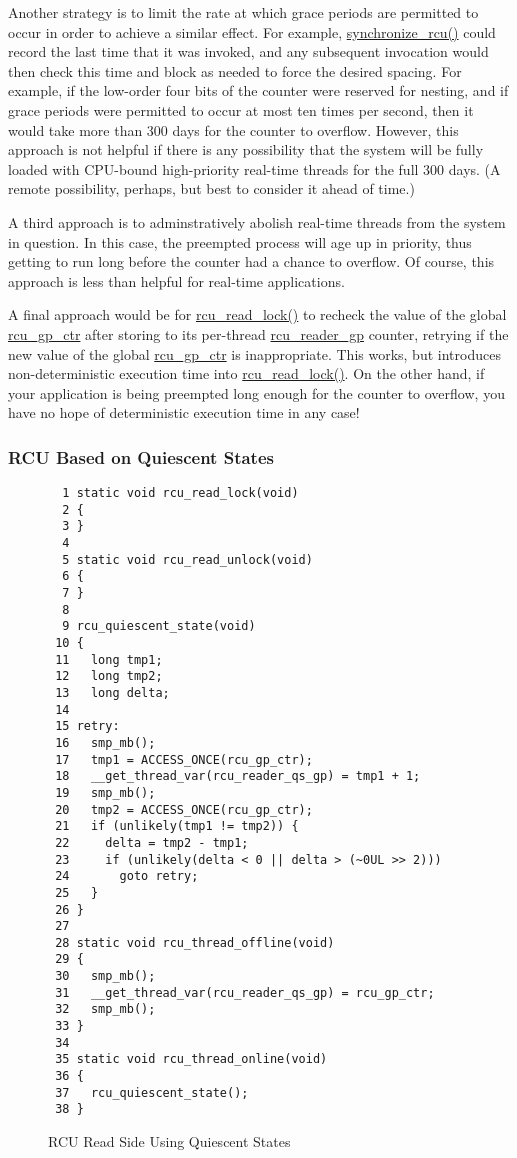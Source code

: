 {	Another strategy is to limit the rate at which grace periods are
	permitted to occur in order to achieve a similar effect.
	For example, \url{synchronize_rcu()} could record the last time
	that it was invoked, and any subsequent invocation would then
	check this time and block as needed to force the desired
	spacing.
	For example, if the low-order four bits of the counter were
	reserved for nesting, and if grace periods were permitted to
	occur at most ten times per second, then it would take more
	than 300 days for the counter to overflow.
	However, this approach is not helpful if there is any possibility
	that the system will be fully loaded with CPU-bound high-priority
	real-time threads for the full 300 days.
	(A remote possibility, perhaps, but best to consider it ahead
	of time.)

	A third approach is to adminstratively abolish real-time threads
	from the system in question.
	In this case, the preempted process will age up in priority,
	thus getting to run long before the counter had a chance to
	overflow.
	Of course, this approach is less than helpful for real-time
	applications.

	A final approach would be for \url{rcu_read_lock()} to recheck
	the value of the global \url{rcu_gp_ctr} after storing to its
	per-thread \url{rcu_reader_gp} counter, retrying if the new
	value of the global \url{rcu_gp_ctr} is inappropriate.
	This works, but introduces non-deterministic execution time
	into \url{rcu_read_lock()}.
	On the other hand, if your application is being preempted long
	enough for the counter to overflow, you have no hope of
	deterministic execution time in any case!
} \QuickQuizEnd

\subsubsection{RCU Based on Quiescent States}
\label{defer:RCU Based on Quiescent States}

\begin{figure}[tbp]
{ \scriptsize
\begin{verbatim}
  1 static void rcu_read_lock(void)
  2 {
  3 }
  4 
  5 static void rcu_read_unlock(void)
  6 {
  7 }
  8 
  9 rcu_quiescent_state(void)
 10 {
 11   long tmp1;
 12   long tmp2;
 13   long delta;
 14 
 15 retry:
 16   smp_mb();
 17   tmp1 = ACCESS_ONCE(rcu_gp_ctr);
 18   __get_thread_var(rcu_reader_qs_gp) = tmp1 + 1;
 19   smp_mb();
 20   tmp2 = ACCESS_ONCE(rcu_gp_ctr);
 21   if (unlikely(tmp1 != tmp2)) {
 22     delta = tmp2 - tmp1;
 23     if (unlikely(delta < 0 || delta > (~0UL >> 2)))
 24       goto retry;
 25   }
 26 }
 27 
 28 static void rcu_thread_offline(void)
 29 {
 30   smp_mb();
 31   __get_thread_var(rcu_reader_qs_gp) = rcu_gp_ctr;
 32   smp_mb();
 33 }
 34 
 35 static void rcu_thread_online(void)
 36 {
 37   rcu_quiescent_state();
 38 }
\end{verbatim}
}
\caption{RCU Read Side Using Quiescent States}
\label{fig:defer:RCU Read Side Using Quiescent States}
\end{figure}

